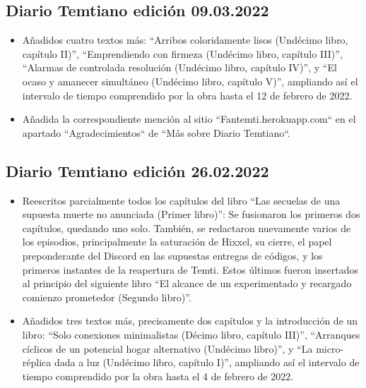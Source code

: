 \documentclass[
]{book}
\begin{document}
\hypertarget{diario-temtiano-ediciuxf3n-09.03.2022}{%
\subsection*{Diario Temtiano edición 09.03.2022}\label{diario-temtiano-ediciuxf3n-09.03.2022}}

\begin{itemize}
\item
  Añadidos cuatro textos más: ``Arribos coloridamente lisos (Undécimo libro, capítulo II)'', ``Emprendiendo con firmeza (Undécimo libro, capítulo III)'', ``Alarmas de controlada resolución (Undécimo libro, capítulo IV)'', y ``El ocaso y amanecer simultáneo (Undécimo libro, capítulo V)'', ampliando así el intervalo de tiempo comprendido por la obra hasta el 12 de febrero de 2022.
\item
  Añadida la correspondiente mención al sitio ``Fantemti.herokuapp.com`` en el apartado ``Agradecimientos`` de ``Más sobre Diario Temtiano``.
\end{itemize}

\hypertarget{diario-temtiano-ediciuxf3n-26.02.2022}{%
\subsection*{Diario Temtiano edición 26.02.2022}\label{diario-temtiano-ediciuxf3n-26.02.2022}}

\begin{itemize}
\item
  Reescritos parcialmente todos los capítulos del libro ``Las secuelas de una supuesta muerte no anunciada (Primer libro)'': Se fusionaron los primeros dos capítulos, quedando uno solo. También, se redactaron nuevamente varios de los episodios, principalmente la saturación de Hixxel, su cierre, el papel preponderante del Discord en las supuestas entregas de códigos, y los primeros instantes de la reapertura de Temti. Estos últimos fueron insertados al principio del siguiente libro ``El alcance de un experimentado y recargado comienzo prometedor (Segundo libro)''.
\item
  Añadidos tres textos más, precisamente dos capítulos y la introducción de un libro: ``Solo conexiones minimalistas (Décimo libro, capítulo III)'', ``Arranques cíclicos de un potencial hogar alternativo (Undécimo libro)'', y ``La micro-réplica dada a luz (Undécimo libro, capítulo I)'', ampliando así el intervalo de tiempo comprendido por la obra hasta el 4 de febrero de 2022.
\end{itemize}
\end{document}
